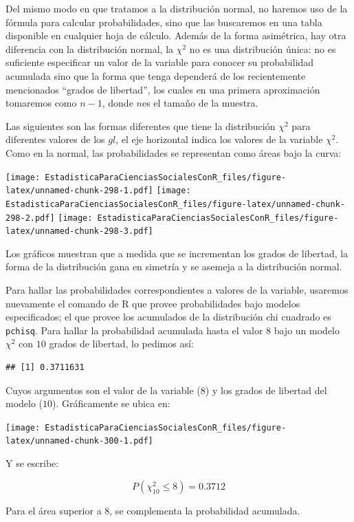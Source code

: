 \documentclass[]{book}
\begin{document}
Del mismo modo en que tratamos a la distribución normal, no haremos uso
de la fórmula para calcular probabilidades, sino que las buscaremos en
una tabla disponible en cualquier hoja de cálculo. Además de la forma
asimétrica, hay otra diferencia con la distribución normal, la
\(\chi^{2}\) no es una distribución única: no es suficiente especificar un valor de la variable para conocer su probabilidad acumulada sino que la forma que tenga dependerá de los recientemente mencionados ``grados de libertad'', los cuales en una primera aproximación tomaremos como \(n-1\), donde \(n\)es el tamaño de la muestra.

Las siguientes son las formas diferentes que tiene la distribución
\(\chi^{2}\) para diferentes valores de los \(gl\), el eje horizontal indica los valores de la variable \(\chi^{2}\). Como en la normal, las
probabilidades se representan como áreas bajo la curva:

\texttt{[image: EstadisticaParaCienciasSocialesConR\_files/figure-latex/unnamed-chunk-298-1.pdf]} \texttt{[image: EstadisticaParaCienciasSocialesConR\_files/figure-latex/unnamed-chunk-298-2.pdf]} \texttt{[image: EstadisticaParaCienciasSocialesConR\_files/figure-latex/unnamed-chunk-298-3.pdf]}

Los gráficos muestran que a medida que se incrementan los grados de
libertad, la forma de la distribución gana en simetría y se asemeja a la distribución normal.

Para hallar las probabilidades correspondientes a valores de la
variable, usaremos nuevamente el comando de R que provee probabilidades bajo modelos especificados; el que provee los acumulados de la distribución chi cuadrado es \texttt{pchisq}. Para hallar la probabilidad acumulada hasta el valor 8 bajo un modelo \(\chi^{2}\) con \(10\) grados de libertad, lo pedimos así:

\begin{verbatim}
## [1] 0.3711631
\end{verbatim}

Cuyos argumentos son el valor de la variable (\(8\)) y los grados de libertad del modelo (\(10\)). Gráficamente se ubica en:

\texttt{[image: EstadisticaParaCienciasSocialesConR\_files/figure-latex/unnamed-chunk-300-1.pdf]}

Y se escribe:

\[P(\chi_{10}^{2} \leq 8) = 0.3712\]

Para el área superior a 8, se complementa la probabilidad acumulada.
\end{document}

